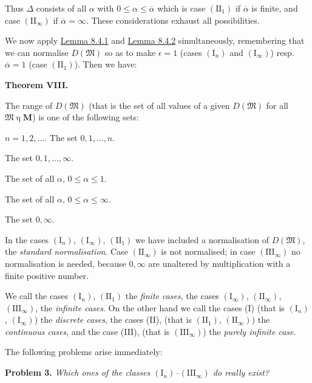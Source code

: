\documentclass[12pt,b5paper,twoside]{article}
\newcommand{\M}{\mathbf M}
\newcommand{\MainTheorem}[1]{%
  \par\smallskip\noindent\phantomsection\label{thm:#1}\textbf{Theorem #1.}\enspace
}
\newcommand{\Problem}[1]{%
  \par\smallskip\noindent\phantomsection\label{prob:#1}\textbf{Problem #1.}\enspace
}
\newcommand{\lemref}[1]{\hyperref[lem:#1]{Lemma #1}}
\begin{document}
Thus $\Delta$ consists of all $\alpha$ with
$0\leq\alpha\leq\overline\alpha$ which is case $(\mathrm{II}_1)$ if
$\overline\alpha$ is finite, and case $(\mathrm{II}_\infty)$ if
$\overline\alpha=\infty$. These considerations exhaust all possibilities.

We now apply \lemref{8.4.1} and \lemref{8.4.2} simultaneously, remembering
that we can normalise $D(\mathfrak M)$ so as to make $\epsilon=1$ (cases
$(\mathrm I_n)$ and $(\mathrm I_\infty)$) resp. $\overline\alpha=1$ (case
$(\mathrm{II}_1)$). Then we have:

\MainTheorem{VIII}
The range of $D(\mathfrak M)$ (that is the set of all values of a given
$D(\mathfrak M)$ for all $\mathfrak M\mathbin\eta\M$) is one of the following
sets:
\begin{description}[style=multiline,leftmargin=4.7em]
\item[$(\mathrm I_n)$] $n=1,2,\ldots$. The set $0,1,\ldots,n$.
\item[$(\mathrm I_\infty)$] The set $0,1,\ldots,\infty$.
\item[$(\mathrm{II}_1)$] The set of all $\alpha$, $0\leq\alpha\leq1$.
\item[$(\mathrm{II}_\infty)$] The set of all $\alpha$,
  $0\leq\alpha\leq\infty$.
\item[$(\mathrm{III}_\infty)$] The set $0,\infty$.
\end{description}

In the cases $(\mathrm I_n)$, $(\mathrm I_\infty)$, $(\mathrm{II}_1)$ we have
included a normalisation of $D(\mathfrak M)$, the \emph{standard
normalisation}. Case $(\mathrm{II}_\infty)$ is not normalised; in case
$(\mathrm{III}_\infty)$ no normalisation is needed, because $0,\infty$ are
unaltered by multiplication with a finite positive number.

We call the cases $(\mathrm I_n)$, $(\mathrm{II}_1)$ the \emph{finite cases},
the cases $(\mathrm I_\infty)$, $(\mathrm{II}_\infty)$,
$(\mathrm{III}_\infty)$, the \emph{infinite cases}. On the other hand we call
the cases (I) (that is $(\mathrm I_n)$, $(\mathrm I_\infty)$) the
\emph{discrete cases}, the cases (II), (that is $(\mathrm{II}_1)$,
$(\mathrm{II}_\infty)$) the \emph{continuous cases}, and the case (III), (that
is $(\mathrm{III}_\infty)$) the \emph{purely infinite case}.

The following problems arise immediately:

\Problem{3}\emph{Which ones of the classes
$(\mathrm I_n)$--$(\mathrm{III}_\infty)$ do really exist?}
\end{document}
